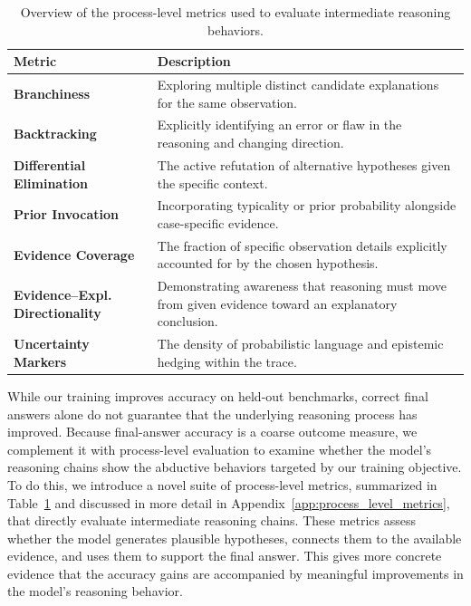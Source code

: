 \documentclass[11pt]{article}
\begin{document}
\begin{table}[t]
  \centering
  \small
  \setlength{\tabcolsep}{4pt}
  \begin{tabularx}{\linewidth}{@{}p{2.3cm} X@{}}
    \toprule
    \textbf{Metric} & \textbf{Description} \\
    \midrule
    \textbf{Branchiness} & \raggedright\arraybackslash Exploring multiple distinct candidate explanations for the same observation. \\
    \addlinespace
    \textbf{Backtracking} & \raggedright\arraybackslash Explicitly identifying an error or flaw in the reasoning and changing direction. \\
    \addlinespace
    \textbf{Differential \newline Elimination} & \raggedright\arraybackslash The active refutation of alternative hypotheses given the specific context. \\
    \addlinespace
    \textbf{Prior Invocation} & \raggedright\arraybackslash Incorporating typicality or prior probability alongside case-specific evidence. \\
    \addlinespace
    \textbf{Evidence \newline Coverage} & \raggedright\arraybackslash The fraction of specific observation details explicitly accounted for by the chosen hypothesis. \\
    \addlinespace
    \textbf{Evidence--Expl. \newline Directionality} & \raggedright\arraybackslash Demonstrating awareness that reasoning must move from given evidence toward an explanatory conclusion. \\
    \addlinespace
    \textbf{Uncertainty \newline Markers} & \raggedright\arraybackslash The density of probabilistic language and epistemic hedging within the trace. \\
    \bottomrule
  \end{tabularx}
  \caption{Overview of the process-level metrics used to evaluate intermediate reasoning behaviors.}
  \label{tab:metrics-taxonomy}
\end{table}

While our training improves accuracy on held-out benchmarks, correct final answers alone do not guarantee that the underlying reasoning process has improved. Because final-answer accuracy is a coarse outcome measure, we complement it with process-level evaluation to examine whether the model's reasoning chains show the abductive behaviors targeted by our training objective. To do this, we introduce a novel suite of process-level metrics, summarized in Table~\ref{tab:metrics-taxonomy} and discussed in more detail in Appendix~\ref{app:process_level_metrics}, that directly evaluate intermediate reasoning chains. These metrics assess whether the model generates plausible hypotheses, connects them to the available evidence, and uses them to support the final answer. This gives more concrete evidence that the accuracy gains are accompanied by meaningful improvements in the model's reasoning behavior.
\end{document}
